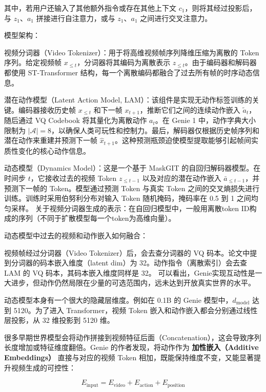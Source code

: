 其中，若用户还输入了其他额外指令或存在其他上下文 \(c_1\)，则将其经过投影后，与 \(z_1\)、\(a_1\) 拼接进行自注意力，或与 \(z_1\)、\(a_1\) 之间进行交叉注意力。

模型架构：

视频分词器（Video Tokenizer）：用于将高维视频帧序列降维压缩为离散的 Token 序列。给定视频帧 \(x_{\le t}\)，分词器将其编码为离散表示 \(z_{\le t}\)。由于编码器和解码器都使用 ST-Transformer 结构，每一个离散编码都融合了过去所有帧的时序动态信息。

潜在动作模型（Latent Action Model, LAM）：该组件是实现无动作标签训练的关键。编码器接收历史帧 \(x_{\le t}\) 和下一帧 \(x_{t+1}\)，推断它们之间的连续动作嵌入 \(\tilde{a}_t\)，随后通过 VQ Codebook 将其量化为离散动作 \(a_t\)。在 Genie 1 中，动作字典大小限制为 \(|\mathcal{A}|=8\)，以确保人类可玩性和控制力。最后，解码器仅根据历史帧序列和潜在动作来重建并预测下一帧 \(\hat{x}_{t+1}\)。这种预测瓶颈迫使模型提取能够引起帧间实质性变化的核心动作信息。

动态模型（Dynamics Model）：这是一个基于 MaskGIT 的自回归解码器模型。在时间步 \(t\)，它接收过去的视频 Token \(z_{\le t-1}\) 以及对应的潜在动作嵌入 \(\bar{a}_{\le t-1}\)，并预测下一帧的 Token。模型通过预测 Token 与真实 Token 之间的交叉熵损失进行训练。训练时采用伯努利分布对输入 Token 随机掩码，掩码率在 0.5 到 1 之间均匀采样。
关于视频分词器生成的表示：在自回归模型中，一般用离散token ID构成的序列（不同于扩散模型每一个token为高维向量）。

动态模型中过去的视频和动作嵌入如何融合：

视频帧经过分词器（Video Tokenizer）后，会去查分词器的 VQ 码本。论文中提到分词器的码本嵌入维度（latent dim）为 32。动作指令（离散索引）会去查 LAM 的 VQ 码本，其码本嵌入维度同样是 32。
可以看出，Genie实现互动性是一大进步，但动作仍然局限在少量的可选范围内，远未达到开放真实世界的水平。

动态模型本身有一个很大的隐藏层维度。例如在 0.1B 的 Genie 模型中，\(d_{\mathrm{model}}\) 达到 5120。为了进入 Transformer，视频 Token 嵌入和动作嵌入都会分别通过线性层投影，从 32 维投影到 5120 维。

很多早期世界模型会将动作拼接到视频特征后面（Concatenation），这会导致序列长度增加或特征维度翻倍。Genie 的作者发现，将动作作为 \textbf{加性嵌入（Additive Embeddings）} 直接与对应的视频 Token 相加，既能保持维度不变，又能显著提升视频生成的可控性：

\[
E_{\mathrm{input}}=E_{\mathrm{video}}+E_{\mathrm{action}}+E_{\mathrm{position}}
\]

